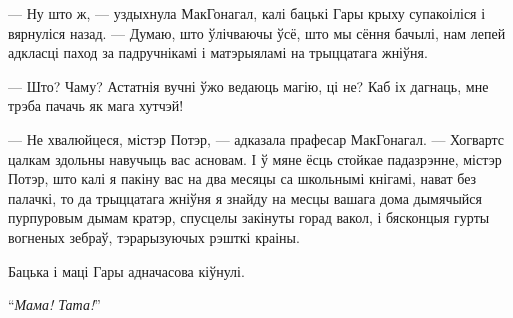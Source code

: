 --- Ну што ж, --- уздыхнула МакГонагал, калі бацькі Гары крыху супакоіліся і вярнуліся
назад. --- Думаю, што ўлічваючы ўсё, што мы сёння бачылі, нам лепей адкласці паход за 
падручнікамі і матэрыяламі на трыццатага жніўня.

--- Што? Чаму? Астатнія вучні ўжо ведаюць магію, ці не? Каб іх дагнаць, мне трэба пачачь
як мага хутчэй!

--- Не хвалюйцеся, містэр Потэр, --- адказала прафесар МакГонагал. --- Хогвартс цалкам здольны
навучыць вас асновам. І ў мяне ёсць стойкае падазрэнне, містэр Потэр, што калі я пакіну вас на
два месяцы са школьнымі кнігамі, нават без палачкі, то да трыццатага жніўня я знайду на месцы 
вашага дома дымячыйся пурпуровым дымам кратэр, спусцелы закінуты горад вакол, і бясконцыя гурты
вогненых зебраў, тэрарызуючых рэшткі краіны.

Бацька і маці Гары адначасова кіўнулі.  

“\emph{Мама! Тата!}”
